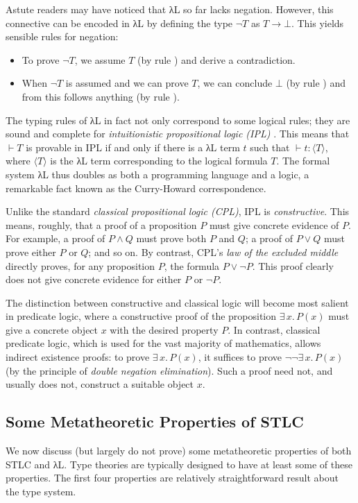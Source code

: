 \documentclass{article}
\theoremstyle{definition}
\newcommand{\Ex}[2]{∃\,#1.\, #2}
\newcommand{\lbl}[1]{\RightTirNameStyle{#1}}
\begin{document}
Astute readers may have noticed that λL so far lacks negation.
However, this connective can be encoded in λL by defining the type $¬ T$ as $T → ⊥$.
This yields sensible rules for negation:
\begin{itemize}
  \item To prove $¬ T$, we assume $T$ (by rule \lbl{Abs}) and derive a contradiction.
  \item When $¬ T$ is assumed and we can prove $T$, we can conclude $⊥$ (by rule \lbl{App}) and from this follows anything (by rule \lbl{Absurd}).
\end{itemize}

The typing rules of λL in fact not only correspond to some logical rules; they are sound and complete for \emph{intuitionistic propositional logic (IPL)} .
This means that $⊢ T$ is provable in IPL if and only if there is a λL term $t$ such that $⊢ t : ⟨T⟩$, where $⟨T⟩$ is the λL term corresponding to the logical formula $T$.
The formal system λL thus doubles as both a programming language and a logic, a remarkable fact known as the Curry-Howard correspondence.

Unlike the standard \emph{classical propositional logic (CPL)}, IPL is \emph{constructive}.
This means, roughly, that a proof of a proposition $P$ must give concrete evidence of $P$.
For example, a proof of $P ∧ Q$ must prove both $P$ and $Q$; a proof of $P ∨ Q$ must prove either $P$ or $Q$; and so on.
By contrast, CPL's \emph{law of the excluded middle} directly proves, for any proposition $P$, the formula $P ∨ ¬ P$.
This proof clearly does not give concrete evidence for either $P$ or $¬ P$.

The distinction between constructive and classical logic will become most salient in predicate logic, where a constructive proof of the proposition $\Ex{x}{P(x)}$ must give a concrete object $x$ with the desired property $P$.
In contrast, classical predicate logic, which is used for the vast majority of mathematics, allows indirect existence proofs:
to prove $\Ex{x}{P(x)}$, it suffices to prove $¬¬ \Ex{x}{P(x)}$ (by the principle of \emph{double negation elimination}).
Such a proof need not, and usually does not, construct a suitable object $x$.

\subsection{Some Metatheoretic Properties of STLC}

We now discuss (but largely do not prove) some metatheoretic properties of both STLC and λL.
Type theories are typically designed to have at least some of these properties.
The first four properties are relatively straightforward result about the type system.
\end{document}

